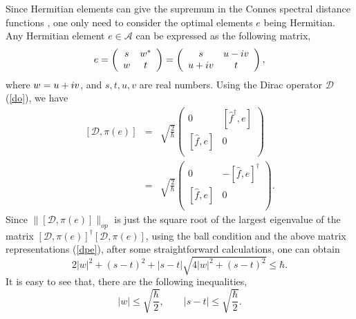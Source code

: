 \documentclass[a4paper,12pt]{article}
\begin{document}
Since Hermitian elements can give the supremum in the Connes spectral
distance functions \cite{Iochum}, one only need to consider the optimal elements $e$ being Hermitian.
Any Hermitian element $e\in \mathcal{A}$ can be expressed as the following matrix,
\begin{equation}\label{ee}
	e=\left(
	\begin{array}{cc}
		s & w^* \\
		w & t \end{array}
	\right)=\left(
	\begin{array}{cc}
		s & u-{\rm i}v \\
		u+{\rm i}v & t \end{array}
	\right),
\end{equation}
where $w=u+{\rm i}v$, and $s,t,u,v$ are real numbers.
Using the Dirac operator $\mathcal{D}$ (\ref{do}), we have
\begin{eqnarray}\label{dpe}
	[\mathcal{D},\pi(e)]&=&\sqrt{\frac{2}{\hbar}}\left(
	\begin{array}{cc}
		0 & [\hat{f}^\dag,e] \\{}
		[\hat{f},e] & 0 \\
	\end{array}\right)\nonumber\\
	&=&\sqrt{\frac{2}{\hbar}}\left(
	\begin{array}{cc}
		0 & -[\hat{f},e]^\dag \\{}
		[\hat{f},e] & 0 \\
	\end{array}\right).
\end{eqnarray}
Since $\|[\mathcal{D},\pi(e)]\|_{op}$ is just the square root of the largest eigenvalue of the matrix $[\mathcal{D},\pi(e)]^\dag[\mathcal{D},\pi(e)]$,
using the ball condition and the above matrix representations (\ref{dpe}), after some straightforward calculations, one can obtain
\begin{equation}
	2|w|^2+(s-t)^2+|s-t|\sqrt{4|w|^2+(s-t)^2}
	\leqslant \hbar.
\end{equation}
It is easy to see that, there are the following inequalities,
\begin{equation}\label{wst}
	|w|\leqslant \sqrt{\frac{\hbar}{2}},\qquad |s-t|\leqslant \sqrt{\frac{\hbar}{2}}.
\end{equation}
\end{document}
